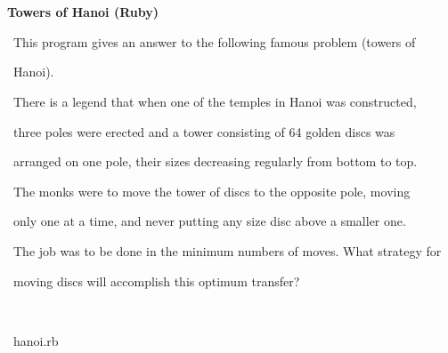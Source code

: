 \documentclass[a4paper,10pt]{article}
\def\mc{\relax}
\begin{document}
\tt\mc 

\noindent
\mbox{}\rm\mc {\tt\#} \hrulefill 
\tt\mc 

\noindent
\mbox{}\rm\mc {\tt\#} \ %
\tt\mc 

\noindent
\mbox{}\rm\mc {\tt\#} \ \centerline{\bf Towers of Hanoi (Ruby)} 
\tt\mc 

\noindent
\mbox{}\rm\mc {\tt\#}  
\tt\mc 

\noindent
\mbox{}\rm\mc {\tt\#} \ \hspace{\leftmargini}This program gives an answer to the following famous problem (towers of 
\tt\mc 

\noindent
\mbox{}\rm\mc {\tt\#} \ \hspace{\leftmargini}Hanoi). 
\tt\mc 

\noindent
\mbox{}\rm\mc {\tt\#} \ \hspace{\leftmargini}There is a legend that when one of the temples in Hanoi was constructed, 
\tt\mc 

\noindent
\mbox{}\rm\mc {\tt\#} \ \hspace{\leftmargini}three poles were erected and a tower consisting of 64 golden discs was 
\tt\mc 

\noindent
\mbox{}\rm\mc {\tt\#} \ \hspace{\leftmargini}arranged on one pole, their sizes decreasing regularly from bottom to top. 
\tt\mc 

\noindent
\mbox{}\rm\mc {\tt\#} \ \hspace{\leftmargini}The monks were to move the tower of discs to the opposite pole, moving 
\tt\mc 

\noindent
\mbox{}\rm\mc {\tt\#} \ \hspace{\leftmargini}only one at a time, and never putting any size disc above a smaller one. 
\tt\mc 

\noindent
\mbox{}\rm\mc {\tt\#} \ \hspace{\leftmargini}The job was to be done in the minimum numbers of moves. What strategy for 
\tt\mc 

\noindent
\mbox{}\rm\mc {\tt\#} \ \hspace{\leftmargini}moving discs will accomplish this optimum transfer? 
\tt\mc 

\noindent
\mbox{}\rm\mc {\tt\#}  \ %
\tt\mc 

\noindent
\mbox{}\rm\mc {\tt\#} \hrulefill\ hanoi.rb \ \hrulefill
\tt\mc 

\noindent
\mbox{}\hfill
\end{document}
